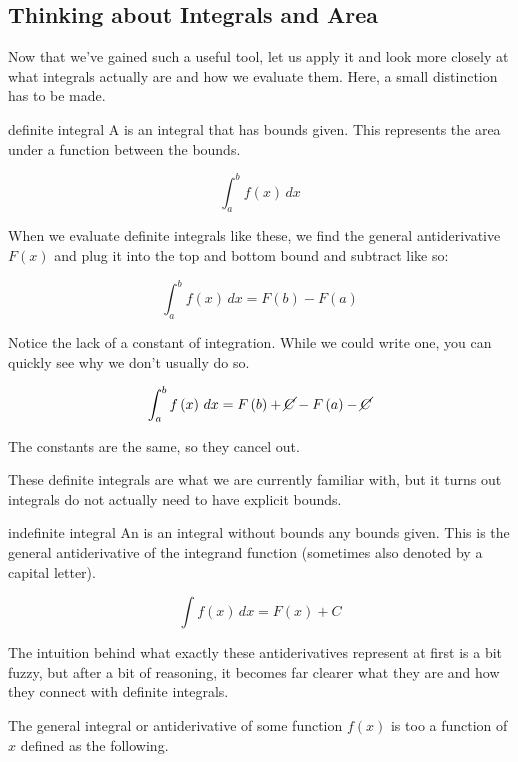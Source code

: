 \subsection{Thinking about Integrals and Area}

Now that we've gained such a useful tool, let us apply it and look more closely at what integrals actually are and how we evaluate them. Here, a small distinction has to be made.

\begin{definition}{definite integral}
    A  is an integral that has bounds given. This represents the area under a function between the bounds.

    \[
        \int_{ a }^{ b } f \left( x \right) \, dx
    \]
\end{definition}

When we evaluate definite integrals like these, we find the general antiderivative \( F \left( x \right) \) and plug it into the top and bottom bound and subtract like so:

\[
    \int_{ a }^{ b } f \left( x \right) \, dx = F \left( b \right) - F \left( a \right)
\]

Notice the lack of a constant of integration. While we could write one, you can quickly see why we don't usually do so.

\[
    \int_{ a }^{ b } f \left( x \right) \, dx = F \left( b \right) + \cancel{C} - F \left( a \right) - \cancel{C}
\]

The constants are the same, so they cancel out.

These definite integrals are what we are currently familiar with, but it turns out integrals do not actually need to have explicit bounds.

\begin{definition}{indefinite integral}
    An  is an integral without bounds any bounds given. This is the general antiderivative of the integrand function (sometimes also denoted by a capital letter).

    \[
        \int f \left( x \right) \, dx = F \left( x \right) + C
    \]
\end{definition}

The intuition behind what exactly these antiderivatives represent at first is a bit fuzzy, but after a bit of reasoning, it becomes far clearer what they are and how they connect with definite integrals.

The general integral or antiderivative of some function \( f \left( x \right) \) is too a function of \( x \) defined as the following.

